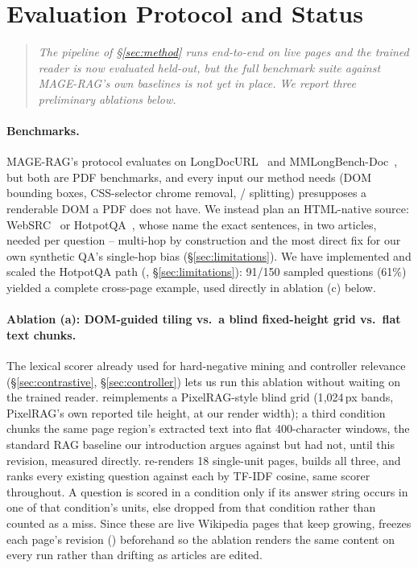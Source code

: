\section{Evaluation Protocol and Status}
\label{sec:experiments}

\begin{quote}
\small\textit{The pipeline of \S\ref{sec:method} runs end-to-end on live pages and the trained reader is now evaluated held-out, but the full benchmark suite against MAGE-RAG's own baselines is not yet in place. We report three preliminary ablations below.}
\end{quote}

\paragraph{Benchmarks.} MAGE-RAG's protocol evaluates on LongDocURL~\citep{longdocurl2024} and MMLongBench-Doc~\citep{mmlongbenchdoc2024}, but both are PDF benchmarks, and every input our method needs (DOM bounding boxes, CSS-selector chrome removal, / splitting) presupposes a renderable DOM a PDF does not have. We instead plan an HTML-native source: WebSRC~\citep{websrc2021} or HotpotQA~\citep{hotpotqa2018}, whose  name the exact sentences, in two articles, needed per question -- multi-hop by construction and the most direct fix for our own synthetic QA's single-hop bias (\S\ref{sec:limitations}). We have implemented and scaled the HotpotQA path (, \S\ref{sec:limitations}): 91/150 sampled questions (61\%) yielded a complete cross-page example, used directly in ablation (c) below.

\paragraph{Ablation (a): DOM-guided tiling vs.\ a blind fixed-height grid vs.\ flat text chunks.} The lexical scorer already used for hard-negative mining and controller relevance (\S\ref{sec:contrastive}, \S\ref{sec:controller}) lets us run this ablation without waiting on the trained reader.  reimplements a PixelRAG-style blind grid (1{,}024\,px bands, PixelRAG's own reported tile height, at our render width); a third condition chunks the same page region's extracted text into flat 400-character windows, the standard RAG baseline our introduction argues against but had not, until this revision, measured directly.  re-renders 18 single-unit pages, builds all three, and ranks every existing  question against each by TF-IDF cosine, same scorer throughout. A question is scored in a condition only if its answer string occurs in one of that condition's units, else dropped from that condition rather than counted as a miss. Since these are live Wikipedia pages that keep growing,  freezes each page's revision () beforehand so the ablation renders the same content on every run rather than drifting as articles are edited.


